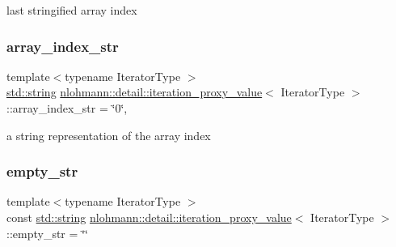 last stringified array index 

\mbox{\label{classnlohmann_1_1detail_1_1iteration__proxy__value_a434324f7bed312c5b4aaedd3c6664e28}} 
\subsubsection{\texorpdfstring{array\+\_\+index\+\_\+str}{array\_index\_str}}
{\footnotesize\ttfamily template$<$typename Iterator\+Type $>$ \\
\hyperlink{namespacenlohmann_1_1detail_a1ed8fc6239da25abcaf681d30ace4985ab45cffe084dd3d20d928bee85e7b0f21}{std\+::string} \hyperlink{classnlohmann_1_1detail_1_1iteration__proxy__value}{nlohmann\+::detail\+::iteration\+\_\+proxy\+\_\+value}$<$ Iterator\+Type $>$\+::array\+\_\+index\+\_\+str = \char`\"{}0\char`\"{}\hspace{0.3cm}{\ttfamily [mutable]}, {\ttfamily [private]}}



a string representation of the array index 

\mbox{\label{classnlohmann_1_1detail_1_1iteration__proxy__value_af970916a35c40e75e2317a6a08370324}} 
\subsubsection{\texorpdfstring{empty\+\_\+str}{empty\_str}}
{\footnotesize\ttfamily template$<$typename Iterator\+Type $>$ \\
const \hyperlink{namespacenlohmann_1_1detail_a1ed8fc6239da25abcaf681d30ace4985ab45cffe084dd3d20d928bee85e7b0f21}{std\+::string} \hyperlink{classnlohmann_1_1detail_1_1iteration__proxy__value}{nlohmann\+::detail\+::iteration\+\_\+proxy\+\_\+value}$<$ Iterator\+Type $>$\+::empty\+\_\+str = \char`\"{}\char`\"{}\hspace{0.3cm}{\ttfamily [private]}}



